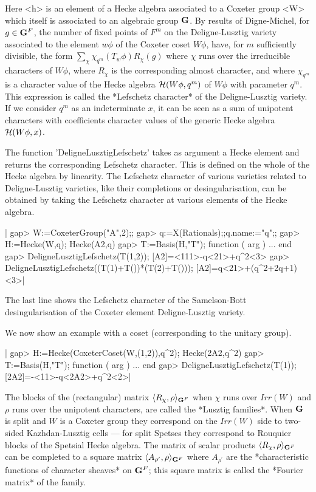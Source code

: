 Here <h> is an element of a Hecke algebra associated to a Coxeter group <W>
which  itself  is  associated  to  an  algebraic group ${\bf G}$. By results of
Digne-Michel,  for $g\in{\bf G}^F$, the number of  fixed points of $F^m$ on the
Deligne-Lusztig  variety associated to  the element $w\phi$  of the Coxeter
coset  $W\phi$, have, for  $m$ sufficiently divisible,  the form $\sum_\chi
\chi_{q^m}(T_w\phi)R_\chi(g)$   where  $\chi$  runs  over  the  irreducible
characters   of  $W\phi$,  where  $R_\chi$   is  the  corresponding  almost
character, and where $\chi_{q^m}$ is a character value of the Hecke algebra
${\cal  H}(W\phi,q^m)$ of $W\phi$ with  parameter $q^m$. This expression is
called  the  *Lefschetz  character*  of  the Deligne-Lusztig variety. If we
consider  $q^m$  as  an  indeterminate  $x$,  it  can  be  seen as a sum of
unipotent  characters  with  coefficients  character  values of the generic
Hecke algebra ${\cal H}(W\phi,x)$.

The  function 'DeligneLusztigLefschetz'  takes as  argument a Hecke element
and  returns the corresponding Lefschetz character.  This is defined on the
whole of the Hecke algebra by linearity. The Lefschetz character of various
varieties  related to Deligne-Lusztig varieties,  like their completions or
desingularisation,  can be  obtained by  taking the  Lefschetz character at
various elements of the Hecke algebra.

|    gap> W:=CoxeterGroup("A",2);;
    gap> q:=X(Rationals);;q.name:="q";;
    gap> H:=Hecke(W,q);
    Hecke(A2,q)
    gap> T:=Basis(H,"T");
    function ( arg ) ... end
    gap> DeligneLusztigLefschetz(T(1,2));
    [A2]=<111>-q<21>+q^2<3>
    gap> DeligneLusztigLefschetz((T(1)+T())*(T(2)+T()));
    [A2]=q<21>+(q^2+2q+1)<3>|

The   last  line  shows  the   Lefschetz  character  of  the  Samelson-Bott
desingularisation of the Coxeter element Deligne-Lusztig variety.

We now show an example with a coset (corresponding to the unitary group).

|    gap> H:=Hecke(CoxeterCoset(W,(1,2)),q^2);
    Hecke(2A2,q^2)
    gap> T:=Basis(H,"T");
    function ( arg ) ... end
    gap> DeligneLusztigLefschetz(T(1));
    [2A2]=-<11>-q<2A2>+q^2<2>|


The blocks of the (rectangular) matrix $\langle R_\chi,\rho\rangle_{{\bf G}^F}$
when  $\chi$  runs  over  $Irr(W)$  and  $\rho$  runs  over  the  unipotent
characters,  are called the *Lusztig families*. When ${\bf G}$ is split and $W$
is  a  Coxeter  group  they  correspond  on  the $Irr(W)$ side to two-sided
Kazhdan-Lusztig  cells ---  for split  Spetses they  correspond to Rouquier
blocks  of  the  Spetsial  Hecke  algebra.  The  matrix  of scalar products
$\langle  R_\chi,\rho\rangle_{{\bf G}^F}$ can  be completed  to a square matrix
$\langle  A_{\rho^\prime},\rho\rangle_{{\bf G}^F}$ where  $A_{\rho^\prime}$ are
the *characteristic functions of character sheaves* on ${\bf G}^F$; this square
matrix is called the *Fourier matrix* of the family.

